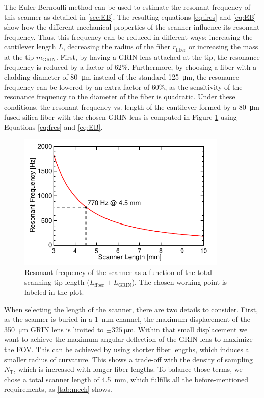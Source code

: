 The Euler-Bernoulli method can be used to estimate the resonant frequency of this scanner as detailed in \autoref{sec:EB}. The resulting equations \ref{eq:fres} and \ref{eq:EB} show how the different mechanical properties of the scanner influence its resonant frequency. Thus, this frequency can be reduced in different ways: increasing the cantilever length $L$, decreasing the radius of the fiber $r_\mathrm{fiber}$ or increasing the mass at the tip $m_{\mathrm{GRIN}}$. First, by having a GRIN lens attached at the tip, the resonance frequency is reduced by a factor of 62\%. Furthermore, by choosing a fiber with a cladding diameter of \SI{80}{\micro\meter} instead of the standard \SI{125}{\micro\meter}, the resonance frequency can be lowered by an extra factor of 60\%, as the sensitivity of the resonance frequency to the diameter of the fiber is quadratic. Under these conditions, the resonant frequency vs. length of the cantilever formed by a \SI{80}{\micro\meter} fused silica fiber with the chosen GRIN lens is computed in Figure \ref{fig:freq} using Equations \ref{eq:fres} and \ref{eq:EB}.

\begin{figure}[h!]\centering
      \includegraphics[width=10cm]{figures/30_DesignSimulation/Mechanical/fres/fres.pdf}
      \caption{Resonant frequency of the scanner as a function of the total scanning tip length ($L_\mathrm{fiber} + L_\mathrm{GRIN}$). The chosen working point is labeled in the plot.}
      \label{fig:freq}
\end{figure}

When selecting the length of the scanner, there are two details to consider. First, as the scanner is buried in a \SI{1}{\milli\meter} channel, the maximum displacement of the \SI{350}{\micro\meter} GRIN lens is limited to $\pm\SI{325}{\micro\meter}$. Within that small displacement we want to achieve the maximum angular deflection of the GRIN lens to maximize the FOV. This can be achieved by using shorter fiber lengths, which induces a smaller radius of curvature. This shows a trade-off with the density of sampling $N_\mathrm{T}$, which is increased with longer fiber lengths. To balance those terms, we chose a total scanner length of \SI{4.5}{\milli\meter}, which fulfills all the before-mentioned requirements, as \autoref{tab:mech} shows. 

